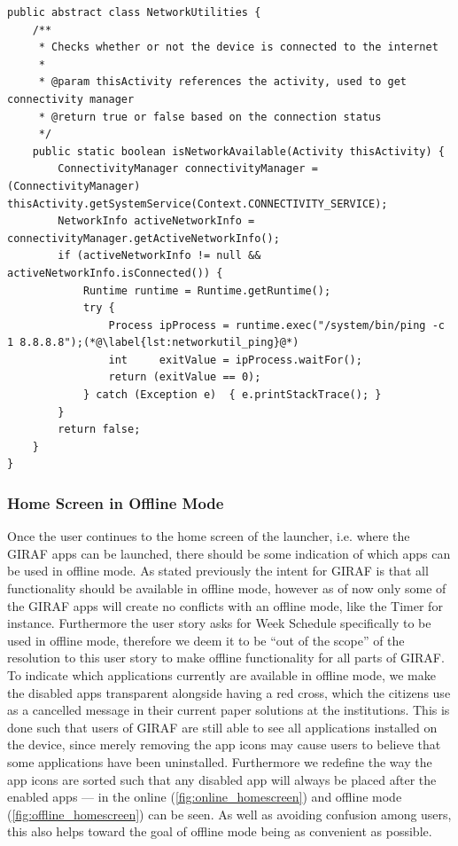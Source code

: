 \begin{lstlisting}[float, floatplacement=h!, caption={The class from the \texttt{giraf-component} library where network utilities are implemented, such as the method used to check if a connection to the internet is available}, label={lst:networkutil}]
public abstract class NetworkUtilities {
    /**
     * Checks whether or not the device is connected to the internet
     *
     * @param thisActivity references the activity, used to get connectivity manager
     * @return true or false based on the connection status
     */
    public static boolean isNetworkAvailable(Activity thisActivity) {
        ConnectivityManager connectivityManager = (ConnectivityManager) thisActivity.getSystemService(Context.CONNECTIVITY_SERVICE);
        NetworkInfo activeNetworkInfo = connectivityManager.getActiveNetworkInfo();
        if (activeNetworkInfo != null && activeNetworkInfo.isConnected()) {
            Runtime runtime = Runtime.getRuntime();
            try {
                Process ipProcess = runtime.exec("/system/bin/ping -c 1 8.8.8.8");(*@\label{lst:networkutil_ping}@*)
                int     exitValue = ipProcess.waitFor();
                return (exitValue == 0);
            } catch (Exception e)  { e.printStackTrace(); }
        }
        return false;
    }
}
\end{lstlisting}

\subsubsection{Home Screen in Offline Mode}
Once the user continues to the home screen of the launcher, i.e. where the GIRAF apps can be launched, there should be some indication of which apps can be used in offline mode.
As stated previously the intent for GIRAF is that all functionality should be available in offline mode, however as of now only some of the GIRAF apps will create no conflicts with an offline mode, like the Timer for instance.
Furthermore the user story asks for Week Schedule specifically to be used in offline mode, therefore we deem it to be \enquote{out of the scope} of the resolution to this user story to make offline functionality for all parts of GIRAF.
To indicate which applications currently are available in offline mode, we make the disabled apps transparent alongside having a red cross, which the citizens use as a cancelled message in their current paper solutions at the institutions.
This is done such that users of GIRAF are still able to see all applications installed on the device, since merely removing the app icons may cause users to believe that some applications have been uninstalled.
Furthermore we redefine the way the app icons are sorted such that any disabled app will always be placed after the enabled apps --- in  the online (\ref{fig:online_homescreen}) and offline mode (\ref{fig:offline_homescreen}) can be seen.
As well as avoiding confusion among users, this also helps toward the goal of offline mode being as convenient as possible.


